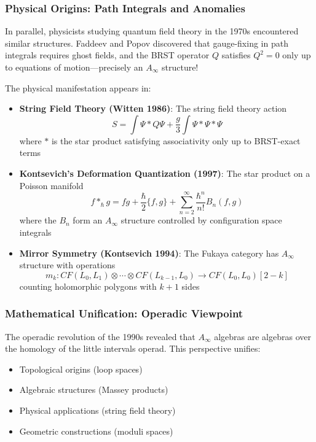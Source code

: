 \subsubsection{Physical Origins: Path Integrals and Anomalies}

In parallel, physicists studying quantum field theory in the 1970s encountered similar structures. Faddeev and Popov discovered that gauge-fixing in path integrals requires ghost fields, and the BRST operator $Q$ satisfies $Q^2 = 0$ only up to equations of motion—precisely an $A_\infty$ structure!

The physical manifestation appears in:
\begin{itemize}
\item \textbf{String Field Theory (Witten 1986)}: The string field theory action
$$S = \int \Psi * Q\Psi + \frac{g}{3}\int \Psi * \Psi * \Psi$$
where $*$ is the star product satisfying associativity only up to BRST-exact terms

\item \textbf{Kontsevich's Deformation Quantization (1997)}: The star product on a Poisson manifold
$$f *_\hbar g = fg + \frac{\hbar}{2}\{f,g\} + \sum_{n=2}^\infty \frac{\hbar^n}{n!}B_n(f,g)$$
where the $B_n$ form an $A_\infty$ structure controlled by configuration space integrals

\item \textbf{Mirror Symmetry (Kontsevich 1994)}: The Fukaya category has $A_\infty$ structure with operations
$$m_k: CF(L_0,L_1) \otimes \cdots \otimes CF(L_{k-1},L_0) \to CF(L_0,L_0)[2-k]$$
counting holomorphic polygons with $k+1$ sides
\end{itemize}

\subsubsection{Mathematical Unification: Operadic Viewpoint}

The operadic revolution of the 1990s revealed that $A_\infty$ algebras are algebras over the homology of the little intervals operad. This perspective unifies:
\begin{itemize}
\item Topological origins (loop spaces)
\item Algebraic structures (Massey products)
\item Physical applications (string field theory)
\item Geometric constructions (moduli spaces)
\end{itemize}

